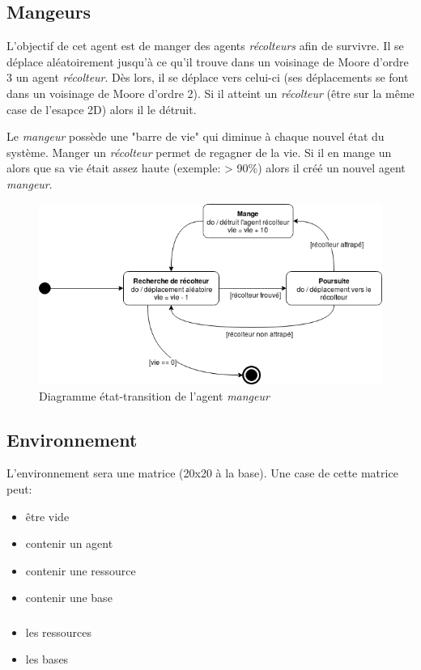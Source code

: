 \documentclass{article}
\begin{document}
\subsection{Mangeurs}
L'objectif de cet agent est de manger des agents \emph{récolteurs} afin de survivre.
Il se déplace aléatoirement jusqu'à ce qu'il trouve dans un voisinage de Moore d'ordre 3
un agent \emph{récolteur}. Dès lors, il se déplace vers celui-ci (ses déplacements se
font dans un voisinage de Moore d'ordre 2). Si il atteint un \emph{récolteur} (être
sur la même case de l'esapce 2D) alors il le détruit.

Le \emph{mangeur} possède une "barre de vie" qui diminue à chaque nouvel état du système.
Manger un \emph{récolteur} permet de regagner de la vie. Si il en mange un alors que sa
vie était assez haute (exemple: > 90\%) alors il créé un nouvel agent \emph{mangeur}.

\begin{figure}[!ht]
  \centering
  \caption{Diagramme état-transition de l'agent \emph{mangeur}}
  \includegraphics[scale=0.75]{img/etat-transition_mangeur.png}
\end{figure}

\subsection{Environnement}
L'environnement sera une matrice (20x20 à la base). Une case de cette matrice peut:
\begin{itemize}
  \item être vide
  \item contenir un agent
  \item contenir une ressource
  \item contenir une base
\end{itemize}

\subsubsection{}
\begin{itemize}
  \item les ressources
  \item les bases
\end{itemize}
\end{document}
